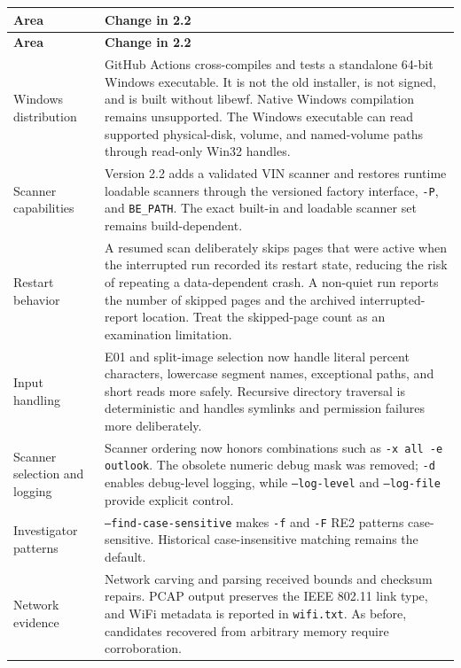 \documentclass[11pt]{article}
\newcommand{\code}[1]{\texttt{#1}}
\begin{document}
\begin{longtable}{p{.25\linewidth}p{.69\linewidth}}
\toprule
\textbf{Area} & \textbf{Change in 2.2} \\
\midrule
\endfirsthead
\toprule
\textbf{Area} & \textbf{Change in 2.2} \\
\midrule
\endhead
Windows distribution & GitHub Actions cross-compiles and tests a standalone
64-bit Windows executable. It is not the old installer, is not signed, and is
built without libewf. Native Windows compilation remains unsupported. The
Windows executable can read supported physical-disk, volume, and named-volume
paths through read-only Win32 handles. \\

Scanner capabilities & Version 2.2 adds a validated VIN scanner and restores
runtime loadable scanners through the versioned factory interface, \code{-P},
and \code{BE\_PATH}. The exact built-in and loadable scanner set remains
build-dependent. \\

Restart behavior & A resumed scan deliberately skips pages that were active
when the interrupted run recorded its restart state, reducing the risk of
repeating a data-dependent crash. A non-quiet run reports the number of skipped
pages and the archived interrupted-report location. Treat the skipped-page
count as an examination limitation. \\

Input handling & E01 and split-image selection now handle literal percent
characters, lowercase segment names, exceptional paths, and short reads more
safely. Recursive directory traversal is deterministic and handles symlinks
and permission failures more deliberately. \\

Scanner selection and logging & Scanner ordering now honors combinations such
as \code{-x all -e outlook}. The obsolete numeric debug mask was removed;
\code{-d} enables debug-level logging, while \code{--log-level} and
\code{--log-file} provide explicit control. \\

Investigator patterns & \code{--find-case-sensitive} makes \code{-f} and
\code{-F} RE2 patterns case-sensitive. Historical case-insensitive matching
remains the default. \\

Network evidence & Network carving and parsing received bounds and checksum
repairs. PCAP output preserves the IEEE 802.11 link type, and WiFi metadata is
reported in \code{wifi.txt}. As before, candidates recovered from arbitrary
memory require corroboration. \\


\end{longtable}
\end{document}
